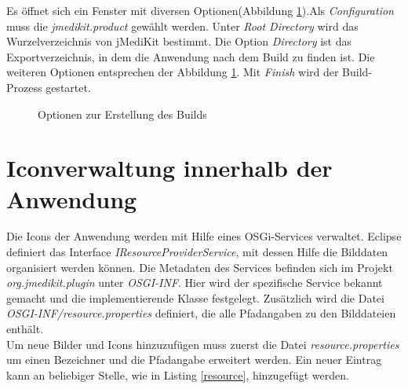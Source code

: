 Es öffnet sich ein Fenster mit diversen Optionen(Abbildung \ref{buildoptions}).Als \textit{Configuration} muss die \textit{jmedikit.product} gewählt werden. Unter \textit{Root Directory} wird das Wurzelverzeichnis von jMediKit bestimmt. Die Option \textit{Directory} ist das Exportverzeichnis, in dem die Anwendung nach dem Build zu finden ist. Die weiteren Optionen entsprechen der Abbildung \ref{buildoptions}. Mit \textit{Finish} wird der Build-Prozess gestartet.

\begin{figure}[H]
  \vspace{0.5cm}
  \centering
  \caption {Optionen zur Erstellung des Builds}
  \label{buildoptions}
  \vspace{0.5cm}
\end{figure}

\chapter{Iconverwaltung innerhalb der Anwendung} \label{importicon}
Die Icons der Anwendung werden mit Hilfe eines OSGi-Services verwaltet. Eclipse definiert das Interface \textit{IResourceProviderService}, mit dessen Hilfe die Bilddaten organisiert werden können. Die Metadaten des Services befinden sich im Projekt \textit{org.jmedikit.plugin} unter \textit{OSGI-INF}. Hier wird der spezifische Service bekannt gemacht und die implementierende Klasse festgelegt. Zusätzlich wird die Datei \textit{OSGI-INF/resource.properties} definiert, die alle Pfadangaben zu den Bilddateien enthält.\\
Um neue Bilder und Icons hinzuzufügen muss zuerst die Datei \textit{resource.properties} um einen Bezeichner und die Pfadangabe erweitert werden. Ein neuer Eintrag kann an beliebiger Stelle, wie in Listing \ref{resource}, hinzugefügt werden.

